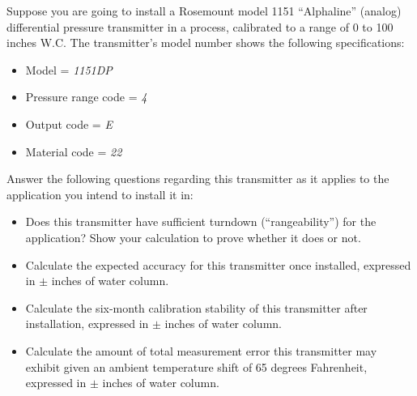 

Suppose you are going to install a Rosemount model 1151 ``Alphaline'' (analog) differential pressure transmitter in a process, calibrated to a range of 0 to 100 inches W.C.  The transmitter's model number shows the following specifications:

\begin{itemize}
\item{} Model = {\it 1151DP}
\item{} Pressure range code = {\it 4}
\item{} Output code = {\it E}
\item{} Material code = {\it 22}
\end{itemize}

Answer the following questions regarding this transmitter as it applies to the application you intend to install it in:

\vskip 20pt

\begin{itemize}
\item{} Does this transmitter have sufficient turndown (``rangeability'') for the application?  Show your calculation to prove whether it does or not.

\vskip 50pt

\item{} Calculate the expected accuracy for this transmitter once installed, expressed in $\pm$ inches of water column.

\vskip 50pt

\item{} Calculate the six-month calibration stability of this transmitter after installation, expressed in $\pm$ inches of water column.

\vskip 50pt

\item{} Calculate the amount of total measurement error this transmitter may exhibit given an ambient temperature shift of 65 degrees Fahrenheit, expressed in $\pm$ inches of water column.


\end{itemize}

\vfil 

\eject





